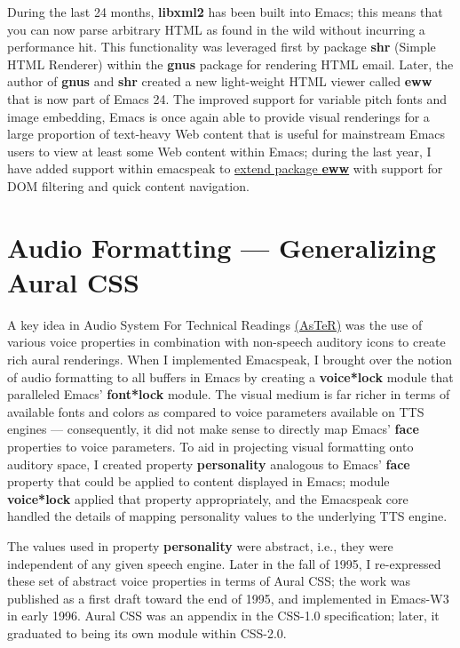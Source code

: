 \documentclass[11pt]{article}
\begin{document}
During the last 24 months, \textbf{libxml2} has been built into Emacs;
this means that you can now parse arbitrary HTML as found in the
wild without incurring a performance hit. This functionality was
leveraged first by package \textbf{shr} (Simple HTML Renderer) within
the \textbf{gnus} package for rendering HTML email. Later, the author of
\textbf{gnus} and \textbf{shr} created a new light-weight HTML viewer called
\textbf{eww} that is now part of Emacs 24. The improved support for
variable pitch fonts and image embedding, Emacs is once again
able to provide visual renderings for a large proportion of
text-heavy Web content that is useful for mainstream Emacs users
to view at least some Web content within Emacs; during the last
year, I have added support within emacspeak to \href{http://emacspeak.blogspot.com/2014/05/emacspeak-eww-updates-for-complete.html}{extend package
\textbf{eww}} with support for DOM filtering and quick content
navigation.

\section{Audio Formatting —  Generalizing Aural CSS}
\label{sec-8}


A key idea in Audio System For Technical Readings \href{http://www.cs.cornell.edu/home/raman/aster/aster-toplevel.html}{(AsTeR)} was the
use of various voice properties in combination with non-speech
auditory icons to create rich aural renderings. When I
implemented Emacspeak, I brought over the notion of audio
formatting to all buffers in Emacs by creating a \textbf{voice*lock}
module that paralleled Emacs' \textbf{font*lock} module. The visual
medium is far richer in terms of available fonts and colors as
compared to voice parameters available on TTS engines —
consequently, it did not make sense to directly map Emacs' \textbf{face}
properties to voice parameters. To aid in projecting visual
formatting onto auditory space, I created property \textbf{personality}
analogous to Emacs' \textbf{face} property that could be applied to
content displayed in Emacs; module \textbf{voice*lock} applied that
property appropriately, and the Emacspeak core handled the
details of mapping personality values to the underlying TTS
engine.

The values used in property \textbf{personality} were abstract, i.e.,
they were independent of any given speech engine. Later in the
fall of 1995, I re-expressed these set of abstract voice
properties in terms of Aural CSS; the work was published as a
first draft toward the end of 1995, and implemented in Emacs-W3
in early 1996. Aural CSS was an appendix in the CSS-1.0
specification; later, it graduated to being its own module within
CSS-2.0.
\end{document}
